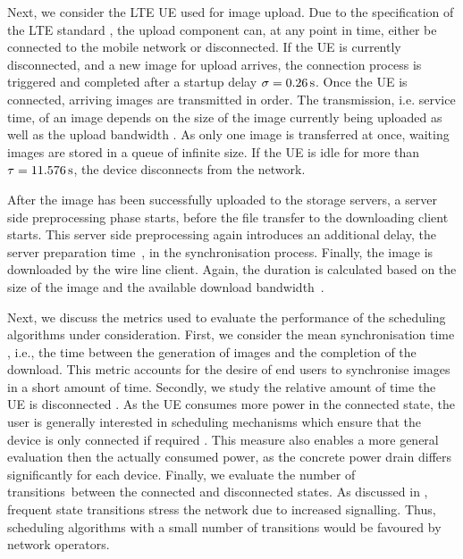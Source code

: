 Next, we consider the \gls{LTE} \gls{UE} used for image upload.
Due to the specification of the \gls{LTE} standard \cite{3GPP_RRC_Spec}, the upload component can, at any point in time, either be connected to the mobile network or disconnected.
If the \gls{UE} is currently disconnected, and a new image for upload arrives, the connection process is triggered and completed after a startup delay \(\sigma = \SI{0.26}{\second}\).
Once the \gls{UE} is connected, arriving images are transmitted in order.
The transmission, i.e. service time, of an image depends on the size of the image currently being uploaded as well as the upload bandwidth \uploadbandwidth.
As only one image is transferred at once, waiting images are stored in a queue of infinite size.
If the \gls{UE} is idle for more than \(\tau = \SI{11.576}{\second}\), the device disconnects from the network.

After the image has been successfully uploaded to the storage servers, a server side preprocessing phase starts, before the file transfer to the downloading client starts.
This server side preprocessing again introduces an additional delay, the server preparation time~\serverpreparationtime, in the synchronisation process.
Finally, the image is downloaded by the wire line client.
Again, the duration is calculated based on the size of the image and the available download bandwidth~\downloadbandwidth.

Next, we discuss the metrics used to evaluate the performance of the scheduling algorithms under consideration.
First, we consider the mean synchronisation time \sojournTime, i.e., the time between the generation of images and the completion of the download.
This metric accounts for the desire of end users to synchronise images in a short amount of time.
Secondly, we study the relative amount of time the \gls{UE} is disconnected \relativeDisconnectedTime.
As the \gls{UE} consumes more power in the connected state, the user is generally interested in scheduling mechanisms which ensure that the device is only connected if required \cite{Ickin2012}.
This measure also enables a more general evaluation then the actually consumed power, as the concrete power drain differs significantly for each device.
Finally, we evaluate the number of transitions~\connectionCount between the connected and disconnected states.
As discussed in , frequent state transitions stress the network due to increased signalling.
Thus, scheduling algorithms with a small number of transitions would be favoured by network operators.

